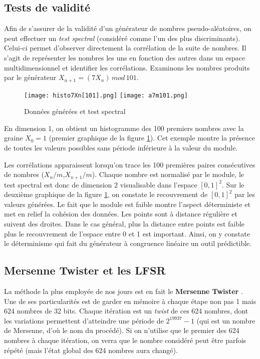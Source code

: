 \documentclass{scrartcl}
\begin{document}
\subsection{Tests de validité}
Afin de s'assurer de la validité d'un générateur de nombres pseudo-aléatoires, on peut effectuer un \textit{ test spectral} (considéré comme l'un des plus discriminants). Celui-ci permet d'observer directement la corrélation de la suite de nombres.
Il s'agit de représenter les nombres les uns en fonction des autres dans un espace multidimensionnel et identifier les corrélations.
Examinons les nombres produits par le générateur $X_{n+1} =(7 X_{n})\, mod\, 101$.
\begin{figure}
    \begin{center}
    \texttt{[image: histo7Xn[101].png]}
    \hspace{0.1\textwidth}
    \texttt{[image: a7m101.png]}
    \end{center}
    \caption{Données générées et test spectral}
  \label{fig:DGTS}
  \end{figure}
  En dimension 1, on obtient un histogramme des 100 premiers nombres avec la graine $X_0 = 1$ (premier graphique de la figure \ref{fig:DGTS}).
  Cet exemple montre la présence de toutes les valeurs possibles sans période inférieure à la valeur du module.\par
Les corrélations apparaissent lorsqu'on trace les 100 premières paires consécutives de nombres ($X_n/m$,$X_{n+1}/m$).
 Chaque nombre est normalisé par le module, le test spectral est donc de dimension 2 visualisable dans l'espace $[0,1]^2$.
 Sur le deuxième graphique de la figure \ref{fig:DGTS}, on constate le recouvrement de $[0,1]^2$ par les valeurs générées. 
 Le fait que le module est faible montre l'aspect déterministe et met en relief la cohésion des données. Les points sont à distance régulière et suivent des droites. 
 Dans le cas général, plus la distance entre points est faible plus le recouvrement de l'espace entre 0 et 1 est important.
Ainsi, on y constate le déterminisme qui fait du générateur à congruence linéaire un outil prédictible.

\subsection{Mersenne Twister et les LFSR}\label{s:MT}
La méthode la plus employée de nos jours est en fait le \textbf{Mersenne
  Twister} \cite{MT}. Une de ses particularités est de garder en mémoire à
chaque étape non pas 1 mais 624 nombres de 32 bits. Chaque itération est un
\textit{twist} de ces 624 nombres, dont les variations permettent d'atteindre
une période de $2^{19937}-1$ (qui est un nombre de Mersenne, d'où le nom du
procédé). Si on n'utilise que le premier des 624 nombres à chaque itération, on
verra que le nombre considéré peut être parfois répété (mais l'état global des
624 nombres aura changé).
\end{document}
